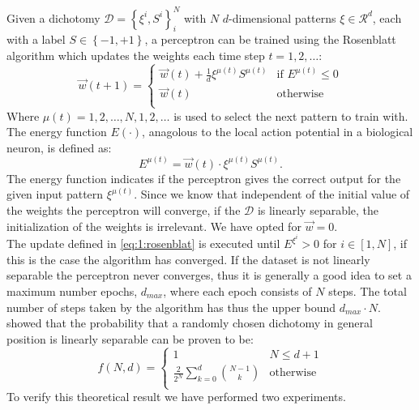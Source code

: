 Given a dichotomy $\mathcal{D} = \left\{\xi^i, S^i \right\}_{i}^{N}$ with $N$ $d$-dimensional patterns $\xi \in \mathcal{R}^d$, each with a label $S \in \left\{-1, +1 \right\}$, a perceptron can be trained using the Rosenblatt algorithm  which updates the weights each time step $t = 1, 2, \ldots$:
	\begin{equation}\label{eq:1:rosenblat}
		\vec{w}(t+1) = 
		\begin{cases}
		\vec{w}(t) + \frac{1}{d} \xi^{\mu(t)} S^{\mu(t)}
		& \text{if } E^{\mu(t)} \leq 0\\
		\vec{w}(t) 											
		& \text{otherwise}\\
		\end{cases}
	\end{equation}
Where $\mu(t) = 1, 2, \ldots, N, 1, 2, \ldots$ is used to select the next pattern to train with. The energy function $E(\cdot)$, anagolous to the local action potential in a biological neuron, is defined as:
	\begin{equation}\label{eq:1:energyFunction}
		E^{\mu(t)} = \vec{w}(t) \cdot \xi^{\mu(t)}S^{\mu(t)}.
	\end{equation}
The energy function indicates if the perceptron gives the correct output for the given input pattern $\xi^{\mu(t)}$. Since we know that independent of the initial value of the weights the perceptron will converge, if the $\mathcal{D}$ is linearly separable, the initialization of the weights is irrelevant. We have opted for $\vec{w} = 0$.\\

The update defined in \autoref{eq:1:rosenblat} is executed until $E^{\xi^i} > 0$ for $i \in [1, N]$, if this is the case the algorithm has converged. If the dataset is not linearly separable the perceptron never converges, thus it is generally a good idea to set a maximum number epochs, $d_{max}$, where each epoch consists of $N$ steps. The total number of steps taken by the algorithm has thus the upper bound $d_{max} \cdot N$. \\


\textcite{cover1965geometrical} showed that the probability that a randomly chosen dichotomy  in general position is linearly separable can be proven to be:
	\begin{equation}\label{eq:1:lsChance}
		f(N,d) = 
		\begin{cases}
		1
		& N \leq d + 1\\
		\frac{2}{2^N} \displaystyle\sum_{k = 0}^{d} \binom{N - 1}{k}										
		& \text{otherwise}\\
		\end{cases}
	\end{equation}
To verify this theoretical result we have performed two experiments.


